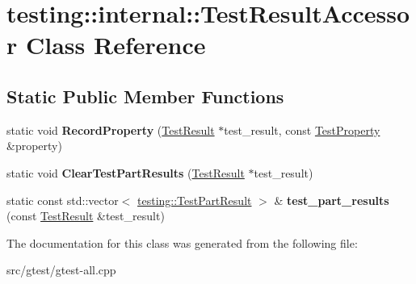 \hypertarget{classtesting_1_1internal_1_1_test_result_accessor}{}\section{testing\+:\+:internal\+:\+:Test\+Result\+Accessor Class Reference}
\label{classtesting_1_1internal_1_1_test_result_accessor}
\subsection*{Static Public Member Functions}
\begin{DoxyCompactItemize}
\item 
\mbox{\label{classtesting_1_1internal_1_1_test_result_accessor_a8e45315473e1ec998d785f0f3826d5a5}} 
static void {\bfseries Record\+Property} (\mbox{\hyperlink{classtesting_1_1_test_result}{Test\+Result}} $\ast$test\+\_\+result, const \mbox{\hyperlink{classtesting_1_1_test_property}{Test\+Property}} \&property)
\item 
\mbox{\label{classtesting_1_1internal_1_1_test_result_accessor_a53c626632bac65d82d88e432072b866b}} 
static void {\bfseries Clear\+Test\+Part\+Results} (\mbox{\hyperlink{classtesting_1_1_test_result}{Test\+Result}} $\ast$test\+\_\+result)
\item 
\mbox{\label{classtesting_1_1internal_1_1_test_result_accessor_a55d771904317c1b0cc380104d175f1db}} 
static const std\+::vector$<$ \mbox{\hyperlink{classtesting_1_1_test_part_result}{testing\+::\+Test\+Part\+Result}} $>$ \& {\bfseries test\+\_\+part\+\_\+results} (const \mbox{\hyperlink{classtesting_1_1_test_result}{Test\+Result}} \&test\+\_\+result)
\end{DoxyCompactItemize}


The documentation for this class was generated from the following file\+:\begin{DoxyCompactItemize}
\item 
src/gtest/gtest-\/all.\+cpp\end{DoxyCompactItemize}
